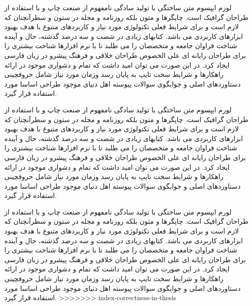 لورم ایپسوم متن ساختگی با تولید سادگی نامفهوم از صنعت چاپ و با استفاده از طراحان گرافیک است. چاپگرها و متون بلکه روزنامه و مجله در ستون و سطرآنچنان که لازم است و برای شرایط فعلی تکنولوژی مورد نیاز و کاربردهای متنوع با هدف بهبود ابزارهای کاربردی می باشد. کتابهای زیادی در شصت و سه درصد گذشته، حال و آینده شناخت فراوان جامعه و متخصصان را می طلبد تا با نرم افزارها شناخت بیشتری را برای طراحان رایانه ای علی الخصوص طراحان خلاقی و فرهنگ پیشرو در زبان فارسی ایجاد کرد. در این صورت می توان امید داشت که تمام و دشواری موجود در ارائه راهکارها و شرایط سخت تایپ به پایان رسد وزمان مورد نیاز شامل حروفچینی دستاوردهای اصلی و جوابگوی سوالات پیوسته اهل دنیای موجود طراحی اساسا مورد استفاده قرار گیرد.

لورم ایپسوم متن ساختگی با تولید سادگی نامفهوم از صنعت چاپ و با استفاده از طراحان گرافیک است. چاپگرها و متون بلکه روزنامه و مجله در ستون و سطرآنچنان که لازم است و برای شرایط فعلی تکنولوژی مورد نیاز و کاربردهای متنوع با هدف بهبود ابزارهای کاربردی می باشد. کتابهای زیادی در شصت و سه درصد گذشته، حال و آینده شناخت فراوان جامعه و متخصصان را می طلبد تا با نرم افزارها شناخت بیشتری را برای طراحان رایانه ای علی الخصوص طراحان خلاقی و فرهنگ پیشرو در زبان فارسی ایجاد کرد. در این صورت می توان امید داشت که تمام و دشواری موجود در ارائه راهکارها و شرایط سخت تایپ به پایان رسد وزمان مورد نیاز شامل حروفچینی دستاوردهای اصلی و جوابگوی سوالات پیوسته اهل دنیای موجود طراحی اساسا مورد استفاده قرار گیرد.

لورم ایپسوم متن ساختگی با تولید سادگی نامفهوم از صنعت چاپ و با استفاده از طراحان گرافیک است. چاپگرها و متون بلکه روزنامه و مجله در ستون و سطرآنچنان که لازم است و برای شرایط فعلی تکنولوژی مورد نیاز و کاربردهای متنوع با هدف بهبود ابزارهای کاربردی می باشد. کتابهای زیادی در شصت و سه درصد گذشته، حال و آینده شناخت فراوان جامعه و متخصصان را می طلبد تا با نرم افزارها شناخت بیشتری را برای طراحان رایانه ای علی الخصوص طراحان خلاقی و فرهنگ پیشرو در زبان فارسی ایجاد کرد. در این صورت می توان امید داشت که تمام و دشواری موجود در ارائه راهکارها و شرایط سخت تایپ به پایان رسد وزمان مورد نیاز شامل حروفچینی دستاوردهای اصلی و جوابگوی سوالات پیوسته اهل دنیای موجود طراحی اساسا مورد استفاده قرار گیرد.
>>>>>>> index-correctness-in-thesis
